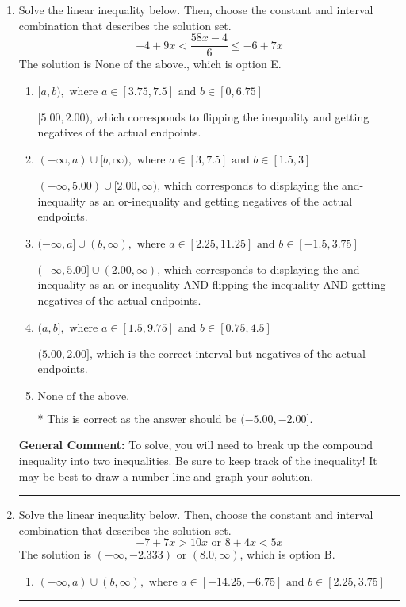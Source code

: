 \documentclass{extbook}[14pt]
\newcommand{\litem}[1]{\item #1

\rule{\textwidth}{0.4pt}}
\begin{document}
\begin{enumerate}
{\begin{enumerate}[label=\Alph*.]
Corresponds to including the endpoints AND negating.
\item \( (-\infty, \infty) \)

Corresponds to the variable canceling, which does not happen in this instance.
\end{enumerate}

\textbf{General Comment:} When multiplying or dividing by a negative, flip the sign.
}
\litem{
Solve the linear inequality below. Then, choose the constant and interval combination that describes the solution set.
\[ -4 + 9 x < \frac{58 x - 4}{6} \leq -6 + 7 x \]The solution is \( \text{None of the above.} \), which is option E.\begin{enumerate}[label=\Alph*.]
\item \( [a, b), \text{ where } a \in [3.75, 7.5] \text{ and } b \in [0, 6.75] \)

$[5.00, 2.00)$, which corresponds to flipping the inequality and getting negatives of the actual endpoints.
\item \( (-\infty, a) \cup [b, \infty), \text{ where } a \in [3, 7.5] \text{ and } b \in [1.5, 3] \)

$(-\infty, 5.00) \cup [2.00, \infty)$, which corresponds to displaying the and-inequality as an or-inequality and getting negatives of the actual endpoints.
\item \( (-\infty, a] \cup (b, \infty), \text{ where } a \in [2.25, 11.25] \text{ and } b \in [-1.5, 3.75] \)

$(-\infty, 5.00] \cup (2.00, \infty)$, which corresponds to displaying the and-inequality as an or-inequality AND flipping the inequality AND getting negatives of the actual endpoints.
\item \( (a, b], \text{ where } a \in [1.5, 9.75] \text{ and } b \in [0.75, 4.5] \)

$(5.00, 2.00]$, which is the correct interval but negatives of the actual endpoints.
\item \( \text{None of the above.} \)

* This is correct as the answer should be $(-5.00, -2.00]$.
\end{enumerate}

\textbf{General Comment:} To solve, you will need to break up the compound inequality into two inequalities. Be sure to keep track of the inequality! It may be best to draw a number line and graph your solution.
}
\litem{
Solve the linear inequality below. Then, choose the constant and interval combination that describes the solution set.
\[ -7 + 7 x > 10 x \text{ or } 8 + 4 x < 5 x \]The solution is \( (-\infty, -2.333) \text{ or } (8.0, \infty) \), which is option B.\begin{enumerate}[label=\Alph*.]
\item \( (-\infty, a) \cup (b, \infty), \text{ where } a \in [-14.25, -6.75] \text{ and } b \in [2.25, 3.75] \)


\end{enumerate}}
\end{enumerate}
\end{document}
